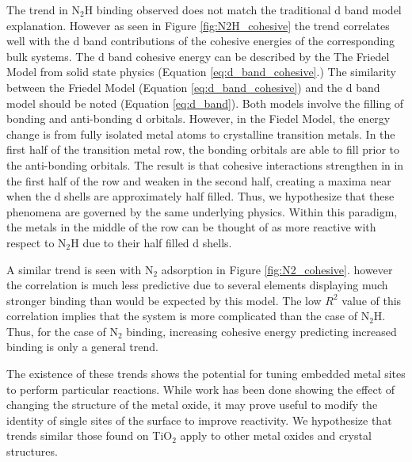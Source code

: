 \documentclass[catalysts,article,submit,moreauthors,pdftex,10pt,a4paper]{mdpi}
\theoremstyle{mdpi}
\newcounter{ex}
\newcounter{re}
\theoremstyle{mdpidefinition}
\begin{document}
The trend in N$_2$H binding observed does not match the traditional d band model explanation. However as seen in Figure \ref{fig:N2H_cohesive} the trend correlates well with the d band contributions of the cohesive energies of the corresponding bulk systems. The d band cohesive energy can be described by the The Friedel Model\cite{1969TPom} from solid state physics (Equation \ref{eq:d_band_cohesive}.) The similarity between the Friedel Model (Equation \ref{eq:d_band_cohesive}) and the d band model should be noted (Equation \ref{eq:d_band}). Both models involve the filling of bonding and anti-bonding d orbitals. However, in the Fiedel Model, the energy change is from fully isolated metal atoms to crystalline transition metals. In the first half of the transition metal row, the bonding orbitals are able to fill prior to the anti-bonding orbitals. The result is that cohesive interactions strengthen in in the first half of the row and weaken in the second half, creating a maxima near when the d shells are approximately half filled. Thus, we hypothesize that these phenomena are governed by the same underlying physics. Within this paradigm, the metals in the middle of the row can be thought of as more reactive with respect to N$_2$H due to their half filled d shells.

A similar trend is seen with N$_2$ adsorption in Figure \ref{fig:N2_cohesive}. however the correlation is much less predictive due to several elements displaying much stronger binding than would be expected by this model. The low $R^2$ value of this correlation implies that the system is more complicated than the case of N$_2$H. Thus, for the case of N$_2$ binding, increasing cohesive energy predicting increased binding is only a general trend. 

The existence of these trends shows the potential for tuning embedded metal sites to perform particular reactions. While work has been done showing the effect of changing the structure of the metal oxide\cite{Back_2019}, it may prove useful to modify the identity of single sites of the surface to improve reactivity. We hypothesize that trends similar those found on TiO$_2$ apply to other metal oxides and crystal structures.

\end{document}
